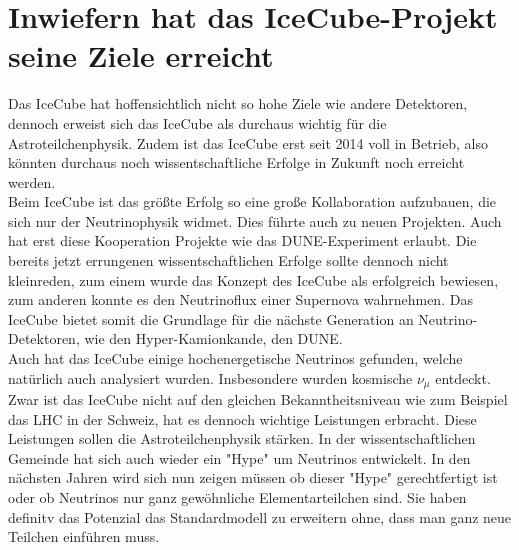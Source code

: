 \chapter{Inwiefern hat das IceCube-Projekt seine Ziele erreicht} 
    \vspace{8pt}
    Das IceCube hat hoffensichtlich nicht so hohe Ziele wie andere Detektoren, dennoch erweist sich das
    IceCube als durchaus wichtig für die Astroteilchenphysik.
    Zudem ist das IceCube erst seit 2014 voll in Betrieb, also könnten durchaus noch wissentschaftliche Erfolge
    in Zukunft noch erreicht werden. \\
    Beim IceCube ist das größte Erfolg so eine große Kollaboration aufzubauen, die sich nur der Neutrinophysik widmet.
    Dies führte auch zu neuen Projekten. Auch hat erst diese Kooperation Projekte wie das DUNE-Experiment erlaubt.
    Die bereits jetzt errungenen wissentschaftlichen Erfolge sollte dennoch nicht kleinreden, zum einem wurde das Konzept 
    des IceCube als erfolgreich bewiesen, zum anderen konnte es den Neutrinoflux einer Supernova wahrnehmen.  
    Das IceCube bietet somit die Grundlage für die nächste Generation an Neutrino-Detektoren, wie den Hyper-Kamionkande, 
    den DUNE. \\
    Auch hat das IceCube einige hochenergetische Neutrinos gefunden, welche natürlich auch analysiert wurden.
    Insbesondere wurden kosmische $\nu_\mu$ entdeckt. 
    Zwar ist das IceCube nicht auf den gleichen Bekanntheitsniveau wie zum Beispiel das LHC in der Schweiz, hat es 
    dennoch wichtige Leistungen erbracht. Diese Leistungen sollen die Astroteilchenphysik stärken. In der wissentschaftlichen
    Gemeinde hat sich auch wieder ein "Hype" um Neutrinos entwickelt. In den nächsten Jahren wird sich nun zeigen müssen
    ob dieser "Hype" gerechtfertigt ist oder ob Neutrinos nur ganz gewöhnliche Elementarteilchen sind. Sie haben definitv 
    das Potenzial das Standardmodell zu erweitern ohne, dass man ganz neue Teilchen einführen muss.
    
